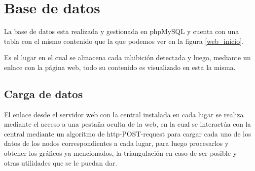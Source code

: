\section{Base de datos}
La base de datos esta realizada y gestionada en phpMySQL y cuenta con una tabla con el mismo contenido que la que podemos ver en la figura \ref{web_inicio}. \par 
Es el lugar en el cual se almacena cada inhibición detectada y luego, mediante un enlace con la página web, todo su contenido es visualizado en esta la misma. 
\subsection{Carga de datos}
\par El enlace desde el servidor web con la central instalada en cada lugar se realiza mediante el acceso a una pestaña oculta de la web, en la cual se interactúa con la central mediante un algoritmo de http-POST-request para cargar cada uno de los datos de los nodos correspondientes a cada lugar, para luego procesarlos y obtener los gráficos ya mencionados, la triangulación en caso de ser posible y otras utilidades que se le puedan dar. 
